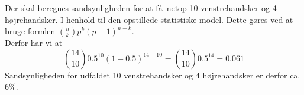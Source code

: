 {
Der skal beregnes sandsynligheden for at f\aa\ netop 10 venstrehandsker og 4 h\o jrehandsker. I henhold til den opstillede statistiske model. Dette g\o res ved at bruge formlen $\binom{n}{k}p^k(p-1)^{n-k}$. \\

Derfor har vi at
\[
\binom{14}{10}0.5^{10}(1-0.5)^{14-10} = \binom{14}{10}0.5^{14} = 0.061
\]
Sandsynligheden for udfaldet 10 venstrehandsker og 4 h\o jrehandsker er derfor ca. 6\%.

}
